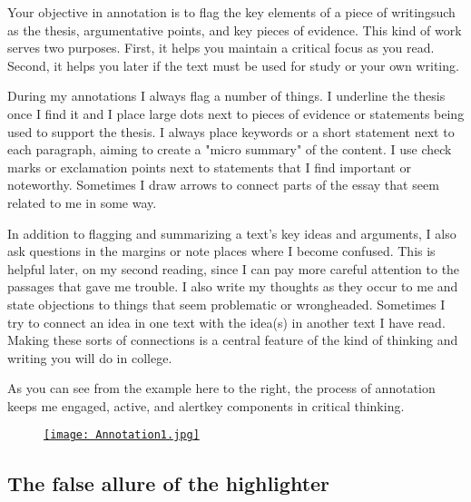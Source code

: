 Your objective in annotation is to flag the key elements of a piece of
writing\textemdash such as the thesis, argumentative points, and key pieces of
evidence. This kind of work serves two purposes. First, it helps you maintain a
critical focus as you read. Second, it helps you later if the text must be used for study or your own writing.

During my annotations I always flag a number of
things. I underline the thesis once I find it and I place large dots
next to pieces of evidence or statements being used to support the
thesis. I always place keywords or a short statement next to each paragraph,
aiming to create a "micro summary" of the content. I use check marks or
exclamation points next to statements that I find important or noteworthy.
Sometimes I draw arrows to connect parts of the essay that seem related to me in
some way.

In addition to flagging and summarizing a text's key ideas and arguments, I also ask
questions in the margins or note places where I become confused. This is helpful
later, on my second reading, since I can pay more careful attention to the
passages that gave me trouble. I also write my thoughts as they occur to me and
state objections to things that seem problematic or wrongheaded. Sometimes I try
to connect an idea in one text with the idea(s) in another text I have read. Making these sorts of connections is a central feature of the kind of thinking and writing you will do in college.

As you can see from the example here to the right, the process of annotation
keeps me engaged, active, and alert\textemdash key components in critical
thinking.

\begin{center} 
\begin{figure}
\href{https://github.com/stockphrase/OpenHandbook/blob/master/Chapters/images/Annotation1.jpg?raw=true}{\texttt{[image: Annotation1.jpg]}}
\end{figure}


\end{center}

\subsection{The false allure of the highlighter}

